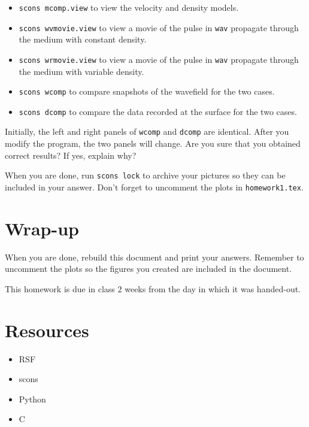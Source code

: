 \begin{enumerate}
\begin{itemize}

\item \texttt{scons mcomp.view} to view the velocity and density models.

\item \texttt{scons wvmovie.view} to view a movie of the pulse in
\texttt{wav} propagate through the medium with constant density.

\item \texttt{scons wrmovie.view} to view a movie of the pulse in
\texttt{wav} propagate through the medium with variable density.

\item \texttt{scons wcomp} to compare snapshots of the wavefield
for the two cases.

\item \texttt{scons dcomp} to compare the data recorded at the surface
for the two cases.

\end{itemize}

Initially, the left and right panels of \texttt{wcomp} and 
\texttt{dcomp} are identical. After you modify the program, the 
two panels will change. Are you sure that you obtained correct 
results? If yes, explain why?

\end{enumerate}

When you are done, run \texttt{scons lock} to archive your pictures 
so they can be included in your answer.
Don't forget to uncomment the plots in \texttt{homework1.tex}.



\section{Wrap-up}

When you are done, rebuild this document and 
print your answers. Remember to uncomment the plots
so the figures you created are included in the document.

This homework is due in class $2$ weeks
from the day in which it was handed-out.


\section{Resources}

\begin{itemize}
\item RSF
\item scons
\item Python
\item C
\end{itemize}
